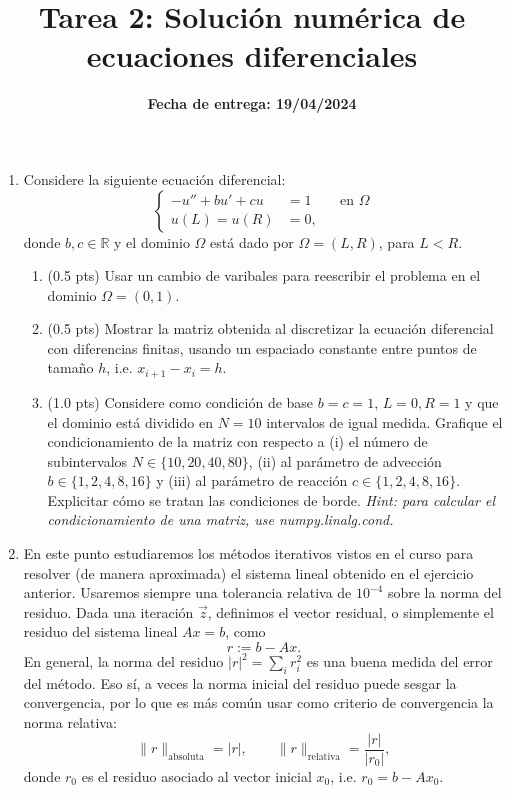 \documentclass{article}
\title{Tarea 2: Solución numérica de ecuaciones diferenciales}
\date{\textbf{Fecha de entrega: 19/04/2024}}
\begin{document}
\maketitle

\begin{enumerate}
    \item Considere la siguiente ecuación diferencial: 
        $$
            \left\lbrace\begin{aligned}
                - u'' + b u' + c u &= 1 && \text{en $\Omega$}\\
                u(L) = u(R) &= 0,
            \end{aligned}\right.
        $$
        donde $b,c\in \mathbb R$ y el dominio $\Omega$ está dado por $\Omega = (L, R)$, para $ L < R$. 
        \begin{enumerate}
            \item (0.5 pts) Usar un cambio de varibales para reescribir el problema en el dominio $\Omega = (0,1)$.
            \item (0.5 pts) Mostrar la matriz obtenida al discretizar la ecuación diferencial con diferencias finitas, usando un espaciado constante entre puntos de tamaño $h$, i.e. $x_{i+1} - x_i = h$.
            \item (1.0 pts) Considere como condición de base $b=c=1$, $L=0, R=1$ y que el dominio está dividido en $N=10$ intervalos de igual medida. Grafique el condicionamiento de la matriz con respecto a (i) el número de subintervalos $N\in \{10,20,40,80\}$, (ii) al parámetro de advección $b \in\{1, 2, 4, 8, 16\}$ y (iii) al parámetro de reacción $c\in\{1, 2, 4, 8, 16\}$. Explicitar cómo se tratan las condiciones de borde. \textit{Hint: para calcular el condicionamiento de una matriz, use numpy.linalg.cond.}
        \end{enumerate} 

    \item En este punto estudiaremos los métodos iterativos vistos en el curso para resolver (de manera aproximada) el sistema lineal obtenido en el ejercicio anterior. Usaremos siempre una tolerancia relativa de $10^{-4}$ sobre la norma del residuo. Dada una iteración $\vec z$, definimos el vector residual, o simplemente el residuo del sistema lineal $Ax = b$, como 
            $$ r := b - Ax. $$
    En general, la norma del residuo $|r|^2 = \sum_i r_i^2$ es una buena medida del error del método. Eso sí, a veces la norma inicial del residuo puede sesgar la convergencia, por lo que es más común usar como criterio de convergencia la norma relativa: 
        $$ \|r\|_\text{absoluta} = |r|, \qquad \|r\|_\text{relativa} = \frac{|r|}{|r_0|}, $$
    donde $r_0$ es el residuo asociado al vector inicial $x_0$, i.e. $r_0 = b - Ax_0$. 


\end{enumerate}
\end{document}
